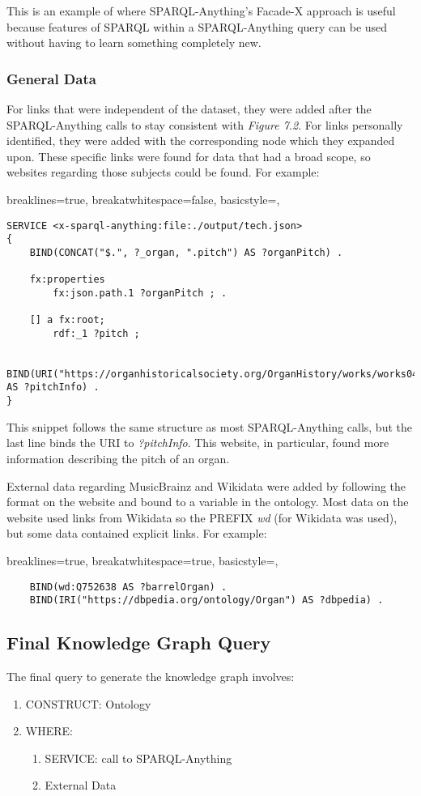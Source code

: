 This is an example of where SPARQL-Anything's Facade-X approach is useful because  features of SPARQL within a SPARQL-Anything query can be used without having to learn something completely new. 

\subsubsection{General Data}
\hspace*{0.5cm} For links that were independent of the dataset, they were added after the SPARQL-Anything calls to stay consistent with \textit{Figure 7.2}. For links personally identified, they were added with the corresponding node which they expanded upon. These specific links were found for data that had a broad scope, so websites regarding those subjects could be found. For example:

\lstset
{
    breaklines=true,
    breakatwhitespace=false,
    basicstyle=\ttfamily,
}
\begin{lstlisting}
SERVICE <x-sparql-anything:file:./output/tech.json>
{
    BIND(CONCAT("$.", ?_organ, ".pitch") AS ?organPitch) .

    fx:properties
        fx:json.path.1 ?organPitch ; .

    [] a fx:root; 
        rdf:_1 ?pitch ;
    
    BIND(URI("https://organhistoricalsociety.org/OrganHistory/works/works04.htm") AS ?pitchInfo) .
} 
\end{lstlisting}

This snippet follows the same structure as most SPARQL-Anything calls, but the last line binds the URI to \textit{?pitchInfo}. This website, in particular, found more information describing the pitch of an organ. 

External data regarding MusicBrainz and Wikidata were added by following the format on the website and bound to a variable in the ontology. Most data on the website used links from Wikidata so the PREFIX \textit{wd} (for Wikidata was used), but some data contained explicit links. For example:

\lstset
{
    breaklines=true,
    breakatwhitespace=true,
    basicstyle=\ttfamily,
}
\begin{lstlisting}
    BIND(wd:Q752638 AS ?barrelOrgan) . 
    BIND(IRI("https://dbpedia.org/ontology/Organ") AS ?dbpedia) .
\end{lstlisting}

\subsection{Final Knowledge Graph Query}
\hspace*{0.5cm} The final query to generate the knowledge graph involves: 

\begin{enumerate}
    \item CONSTRUCT: Ontology
    \item WHERE:
    \begin{enumerate}
        \vspace{-0.25cm}
        \item SERVICE: call to SPARQL-Anything
        \item External Data
    \end{enumerate}
\end{enumerate}

